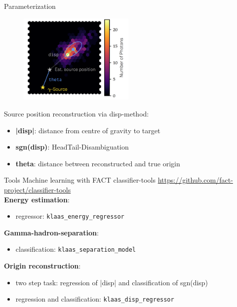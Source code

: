 \begin{frame}[t]{Parameterization}
    \begin{multicols}{2}
        \begin{figure}
            \centering
            \includegraphics[width=0.5\textwidth]{fig/disp.png}
        \end{figure}
    \columnbreak
Source position reconstruction via disp-method:
    \begin{itemize}
        \item \textbf{{\color{tugreen} |disp|}}: distance from centre of gravity to target
        \item \textbf{{\color{tugreen} sgn(disp)}}: Head\/Tail-Disambiguation
        \item \textbf{{\color{tugreen} theta}}: distance between reconstructed and true origin
    \end{itemize}
    \end{multicols}
\end{frame}

\begin{frame}[t]{Tools}
Machine learning with FACT classifier-tools \url{https://github.com/fact-project/classifier-tools} \\
\textbf{{\color{tugreen} Energy estimation}}:
\begin{itemize}
    \item regressor: \texttt{klaas\_energy\_regressor}
\end{itemize}
\textbf{{\color{tugreen} Gamma-hadron-separation}}:
\begin{itemize}
    \item classification: \texttt{klaas\_separation\_model}
\end{itemize}
\textbf{{\color{tugreen} Origin reconstruction}}:
\begin{itemize}
    \item two step task: regression of |disp| and classification of sgn(disp)
    \item regression and classification: \texttt{klaas\_disp\_regressor}
\end{itemize}
\end{frame}

